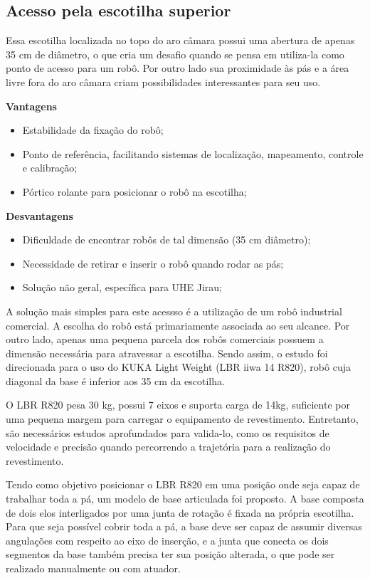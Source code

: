 \subsection{Acesso pela escotilha superior}
Essa escotilha localizada no topo do aro câmara possui uma abertura de apenas
35 cm de diâmetro, o que cria um desafio quando se pensa em utiliza-la como
ponto de acesso para um robô. Por outro lado sua proximidade às pás e a área livre fora do aro
câmara criam possibilidades interessantes para seu uso.

\textbf{Vantagens}
\begin{itemize}
  \item Estabilidade da fixação do robô;
  \item Ponto de referência, facilitando sistemas de localização, mapeamento,
  controle e calibração;
  \item Pórtico rolante para posicionar o robô na escotilha;
\end{itemize}

\textbf{Desvantagens}
\begin{itemize}
  \item Dificuldade de encontrar robôs de tal dimensão (35 cm diâmetro);
  \item Necessidade de retirar e inserir o robô quando rodar as pás;
  \item Solução não geral, específica para UHE Jirau;
\end{itemize}

A solução mais simples para este acessso é a utilização de um robô industrial
comercial. A escolha do robô está primariamente associada ao seu alcance. Por outro lado, apenas
uma pequena parcela dos robôs comerciais possuem a dimensão necessária para
atravessar a escotilha. Sendo assim, o estudo foi direcionada para o uso do
KUKA Light Weight (LBR iiwa 14 R820), robô cuja diagonal da base é inferior aos
35 cm da escotilha.

O LBR R820 pesa 30 kg, possui 7 eixos e suporta carga de 14kg,
suficiente por uma pequena margem para carregar o equipamento de
revestimento. Entretanto, são necessários estudos aprofundados para valida-lo,
como os requisitos de velocidade e precisão quando percorrendo a trajetória
para a realização do revestimento.

Tendo como objetivo posicionar o LBR R820 em uma posição onde seja capaz de
trabalhar toda a pá, um modelo de base articulada foi proposto. A base
composta de dois elos interligados por uma junta de rotação é fixada na
própria escotilha. Para que seja possível cobrir toda a pá,
a base deve ser capaz de assumir diversas angulações com respeito ao
eixo de inserção, e a junta que conecta os dois segmentos da base também precisa
ter sua posição alterada, o que pode ser realizado manualmente ou com atuador.

